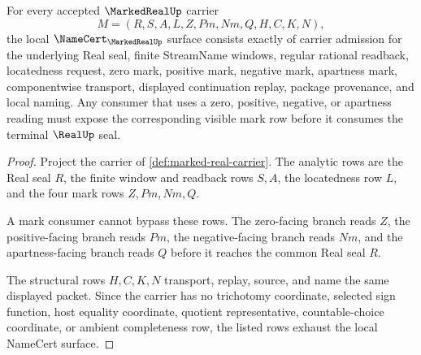 \begin{theorem}
\label{thm:marked-real-namecert-obligations}
For every accepted $\MarkedRealUp$ carrier
$$
M=(R,S,A,L,Z,Pm,Nm,Q,H,C,K,N),
$$
the local $\NameCert_{\MarkedRealUp}$ surface consists exactly of carrier admission for the underlying Real seal, finite StreamName windows, regular rational readback, locatedness request, zero mark, positive mark, negative mark, apartness mark, componentwise transport, displayed continuation replay, package provenance, and local naming. Any consumer that uses a zero, positive, negative, or apartness reading must expose the corresponding visible mark row before it consumes the terminal $\RealUp$ seal.
\end{theorem}
\begin{proof}
Project the carrier of \autoref{def:marked-real-carrier}. The analytic rows are the Real seal $R$, the finite window and readback rows $S,A$, the locatedness row $L$, and the four mark rows $Z,Pm,Nm,Q$.

A mark consumer cannot bypass these rows. The zero-facing branch reads $Z$, the positive-facing branch reads $Pm$, the negative-facing branch reads $Nm$, and the apartness-facing branch reads $Q$ before it reaches the common Real seal $R$.

The structural rows $H,C,K,N$ transport, replay, source, and name the same displayed packet. Since the carrier has no trichotomy coordinate, selected sign function, host equality coordinate, quotient representative, countable-choice coordinate, or ambient completeness row, the listed rows exhaust the local NameCert surface.
\end{proof}

